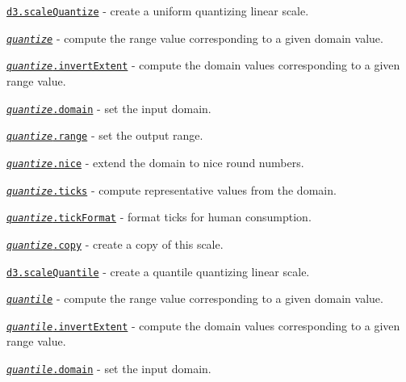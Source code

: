 \begin{DoxyItemize}
\item \href{https://github.com/d3/d3-scale/blob/master/README.md#scaleQuantize}{\tt d3.\+scale\+Quantize} -\/ create a uniform quantizing linear scale.
\item \href{https://github.com/d3/d3-scale/blob/master/README.md#_quantize}{\tt {\itshape quantize}} -\/ compute the range value corresponding to a given domain value.
\item \href{https://github.com/d3/d3-scale/blob/master/README.md#quantize_invertExtent}{\tt {\itshape quantize}.invert\+Extent} -\/ compute the domain values corresponding to a given range value.
\item \href{https://github.com/d3/d3-scale/blob/master/README.md#quantize_domain}{\tt {\itshape quantize}.domain} -\/ set the input domain.
\item \href{https://github.com/d3/d3-scale/blob/master/README.md#quantize_range}{\tt {\itshape quantize}.range} -\/ set the output range.
\item \href{https://github.com/d3/d3-scale/blob/master/README.md#quantize_nice}{\tt {\itshape quantize}.nice} -\/ extend the domain to nice round numbers.
\item \href{https://github.com/d3/d3-scale/blob/master/README.md#quantize_ticks}{\tt {\itshape quantize}.ticks} -\/ compute representative values from the domain.
\item \href{https://github.com/d3/d3-scale/blob/master/README.md#quantize_tickFormat}{\tt {\itshape quantize}.tick\+Format} -\/ format ticks for human consumption.
\item \href{https://github.com/d3/d3-scale/blob/master/README.md#quantize_copy}{\tt {\itshape quantize}.copy} -\/ create a copy of this scale.
\item \href{https://github.com/d3/d3-scale/blob/master/README.md#scaleQuantile}{\tt d3.\+scale\+Quantile} -\/ create a quantile quantizing linear scale.
\item \href{https://github.com/d3/d3-scale/blob/master/README.md#_quantile}{\tt {\itshape quantile}} -\/ compute the range value corresponding to a given domain value.
\item \href{https://github.com/d3/d3-scale/blob/master/README.md#quantile_invertExtent}{\tt {\itshape quantile}.invert\+Extent} -\/ compute the domain values corresponding to a given range value.
\item \href{https://github.com/d3/d3-scale/blob/master/README.md#quantile_domain}{\tt {\itshape quantile}.domain} -\/ set the input domain.

\end{DoxyItemize}

